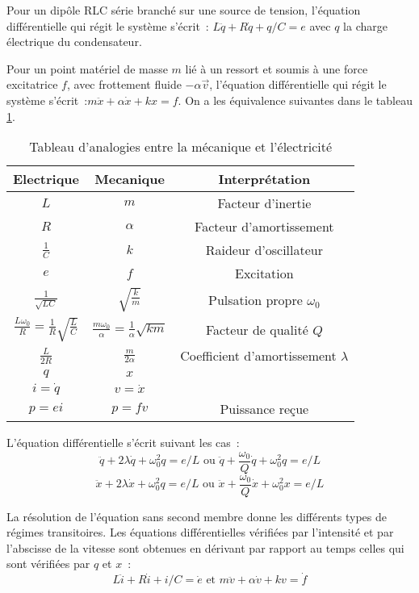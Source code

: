 Pour un dipôle RLC série branché sur une source de tension, l'équation 
différentielle qui régit le système s'écrit~: \(L \ddot{q} + R\dot{q} + q/C = 
e\) avec \(q\) la charge électrique du condensateur.

Pour un point matériel de masse \(m\) lié à un ressort et soumis à une force 
excitatrice \(f\), avec frottement fluide \(-\alpha \vec{v}\), l'équation 
différentielle qui régit le système s'écrit~:\(m\ddot{x}+\alpha \dot{x}+k x = 
f\). On a les équivalence suivantes dans le tableau \ref{tab:equiv}.

\begin{table}[h]
  \centering
  \begin{tabular}{||c|c|c||}
    \hline
    Electrique & Mecanique & Interprétation\\
    \hline
    \(L\) & \(m\) & Facteur d'inertie\\
    \(R\) & \(\alpha\) & Facteur d'amortissement\\
    \(\frac{1}{C}\) & \(k\) & Raideur d'oscillateur\\
    \(e\) & \(f\) & Excitation\\
    \(\frac{1}{\sqrt{LC}}\) & \(\sqrt{\frac{k}{m}}\) & Pulsation propre 
    \(\omega_0\)\\
    \(\frac{L\omega_0}{R} = \frac{1}{R}\sqrt{\frac{L}{C}}\) & 
    \(\frac{m\omega_0}{\alpha} = \frac{1}{\alpha}\sqrt{km}\) & Facteur de 
    qualité \(Q\)\\
    \(\frac{L}{2R}\) & \(\frac{m}{2\alpha}\) & Coefficient d'amortissement 
    \(\lambda\)\\
    \(q\) & \(x\) & \\
    \(i=\dot{q}\) & \(v=\dot{x}\) & \\
    \(p=ei\) & \(p=fv\) & Puissance reçue\\
    \hline
  \end{tabular}
  \caption{Tableau d'analogies entre la mécanique et l'électricité}
  \label{tab:equiv}
\end{table}

L'équation différentielle s'écrit suivant les cas~:
\[\ddot{q}+2\lambda\dot{q}+\omega_0^2 q = e/L \text{~ou~} 
\ddot{q}+\frac{\omega_0}{Q}\dot{q}+\omega_0^2 q = e/L\]
\[\ddot{x}+2\lambda\dot{x}+\omega_0^2 q = e/L \text{~ou~} 
\ddot{x}+\frac{\omega_0}{Q}\dot{x}+\omega_0^2 x = e/L\]

La résolution de l'équation sans second membre donne les différents types de 
régimes transitoires. Les équations différentielles vérifiées par l'intensité et 
par l'abscisse de la vitesse sont obtenues en dérivant par rapport au temps 
celles qui sont vérifiées par \(q\) et \(x\)~:
\[L\ddot{i}+R\dot{i}+i/C = \dot{e} \text{~et~} m\ddot{v}+\alpha\dot{v}+kv = 
\dot{f}\]


